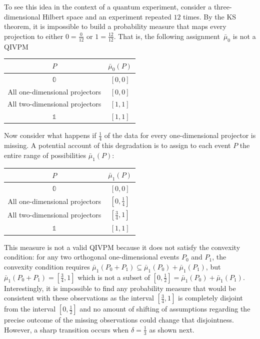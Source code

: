 \documentclass[english,reprint, aps, prl,superscriptaddress, showpacs,
showkeys, longbibliography, amsmath, amssymb, floatfix]{revtex4-1}
\theoremstyle{plain}
\theoremstyle{definition}
\newcommand{\imposs}{\ensuremath{\left[0,0\right]}}
\newcommand{\necess}{\ensuremath{\left[1,1\right]}}
\begin{document}
To see this idea in the context of a quantum experiment, consider
a three-dimensional Hilbert space and an experiment repeated $12$
times. By the KS theorem, it is impossible to build a probability
measure that maps every projection to either $0=\frac{0}{12}$ or
$1=\frac{12}{12}$. That is, the following assignment~$\bar{\mu}_{0}$
is not a QIVPM
\begin{center}
\begin{tabular}{cc}
\toprule 
\addlinespace
$P$  & $\bar{\mu}_{0}\left(P\right)$\tabularnewline
\midrule
\midrule 
\addlinespace
$\mathbb{0}$  & $\imposs$\tabularnewline
\midrule 
\addlinespace
All one-dimensional projectors  & $\left[0,0\right]$\tabularnewline
\midrule 
\addlinespace
All two-dimensional projectors  & $\left[1,1\right]$\tabularnewline
\midrule 
\addlinespace
$\mathbb{1}$  & $\necess$\tabularnewline
\bottomrule
\end{tabular}
\par\end{center}

Now consider what happens if $\frac{1}{4}$ of the data for every
one-dimensional projector is missing. A potential account of this
degradation is to assign to each event $P$ the entire range of possibilities
$\bar{\mu}_{1}(P)$: 
\begin{center}
\begin{tabular}{cc}
\toprule 
\addlinespace
$P$  & $\bar{\mu}_{1}\left(P\right)$\tabularnewline
\midrule
\midrule 
\addlinespace
$\mathbb{0}$  & $\imposs$\tabularnewline
\midrule 
\addlinespace
All one-dimensional projectors  & $\left[0,\tfrac{1}{4}\right]$\tabularnewline
\midrule 
\addlinespace
All two-dimensional projectors  & $\left[\tfrac{3}{4},1\right]$\tabularnewline
\midrule 
\addlinespace
$\mathbb{1}$  & $\necess$\tabularnewline
\bottomrule
\end{tabular}
\par\end{center}

\noindent This measure is not a valid QIVPM because it does not satisfy
the convexity condition: for any two orthogonal one-dimensional events
$P_{0}$ and $P_{1}$, the convexity condition requires $\bar{\mu}_{1}\left(P_{0}+P_{1}\right)\subseteq\bar{\mu}_{1}\left(P_{0}\right)+\bar{\mu}_{1}\left(P_{1}\right)$,
but $\bar{\mu}_{1}\left(P_{0}+P_{1}\right)=\left[\tfrac{3}{4},1\right]$
which is not a subset of $\left[0,\tfrac{1}{2}\right]=\bar{\mu}_{1}\left(P_{0}\right)+\bar{\mu}_{1}\left(P_{1}\right)$.
Interestingly, it is impossible to find any probability measure that
would be consistent with these observations as the interval $\left[\tfrac{3}{4},1\right]$
is completely disjoint from the interval $\left[0,\tfrac{1}{2}\right]$
and no amount of shifting of assumptions regarding the precise outcome
of the missing observations could change that disjointness. However,
a sharp transition occurs when $\delta=\tfrac{1}{3}$ as shown next.
\end{document}

